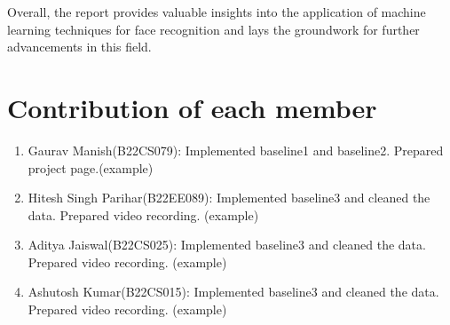 \documentclass[a4paper]{article}
\theoremstyle{plain}
\theoremstyle{definition}
\begin{document}
Overall, the report provides valuable insights into the application of machine learning techniques for face recognition and lays the groundwork for further advancements in this field.\vspace{8pt}
	

	
	
	
	\appendix
	
	\section{Contribution of each member}
	\label{sec:contribution}
	\begin{enumerate}
	\item Gaurav Manish(B22CS079): Implemented baseline1 and baseline2. Prepared project page.(example)
	\item Hitesh Singh Parihar(B22EE089): Implemented baseline3 and cleaned the data. Prepared video recording. (example)
 \item Aditya Jaiswal(B22CS025): Implemented baseline3 and cleaned the data. Prepared video recording. (example)
  \item Ashutosh Kumar(B22CS015): Implemented baseline3 and cleaned the data. Prepared video recording. (example)
	
	\end{enumerate}
    	
	
\end{document}
